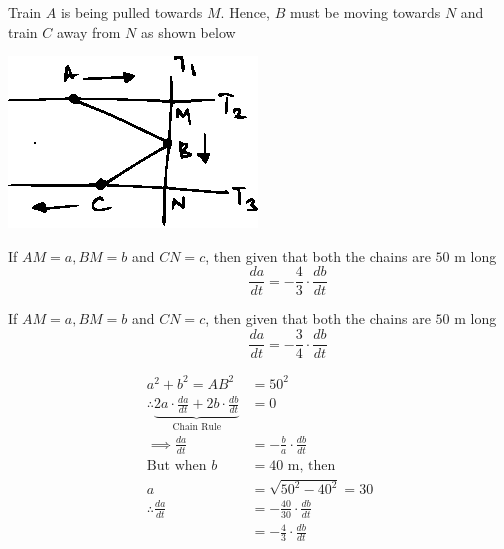 \documentclass[14pt,fleqn]{extarticle}
\newcommand\dadt{\frac{da}{dt}}
\newcommand\dbdt{\frac{db}{dt}}
\begin{document}
\begin{question}
\begin{step}
\begin{options}
	
	\end{options}
	\reason
	
      Train $A$ is being pulled towards $M$.
      Hence, $B$  must be moving towards $N$
      and train $C$ away from $N$ as shown below 
      
      \begin{center}
\includegraphics[scale=1.5]{333-B.eps}
\end{center}
      
\end{step}

\begin{step}
  \begin{options} 
     \correct 
       
     If $AM = a, BM = b$ and $CN = c$, then given that both the chains are $50$ m long 
     \[ \qquad\qquad \dadt = -\frac{4}{3}\cdot\dbdt \]  
     \incorrect
     
     If $AM = a, BM = b$ and $CN = c$, then given that both the chains are $50$ m long 
     \[ \qquad\qquad \dadt = -\frac{3}{4}\cdot\dbdt \]  
        
    \end{options} 
     \reason 
       
     \begin{align}
     a^2 + b^2 = AB^2 &= 50^2\\
     \therefore \underbrace{2a\cdot \dadt + 2b\cdot \dbdt}_{\text{Chain Rule}} &= 0 \\
     \implies \dadt &= -\frac{b}{a}\cdot \dbdt \\
     \text{But when }b &= 40\text{ m, then }\\
     a &= \sqrt{50^2 - 40^2} = 30 \\ 
     \therefore \dadt &= -\frac{40}{30}\cdot\dbdt \\
     &= -\frac{4}{3}\cdot\dbdt
\end{align}  
\end{step}

\begin{step}
  \begin{options} 
     \correct 
       

\end{options}
\end{step}
\end{question}
\end{document}
